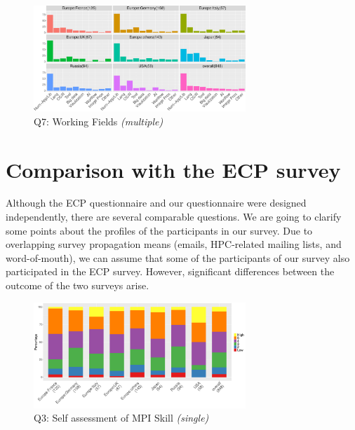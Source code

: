 \documentclass[preprint,5p,times]{elsarticle}
\begin{document}
\begin{figure}[tb]
  \begin{center}
    \includegraphics[width=8.0cm]{R-scripts/Q7.pdf}
    \vspace{-1.5mm}
    \caption{Q7: Working Fields {\it(multiple)}}
    \label{fig:working-fields}
\vspace{-3mm}%
  \end{center}
\end{figure}

\section{Comparison with the ECP survey}\label{sec:ecp}

Although the ECP questionnaire and our questionnaire were designed
independently, there are several comparable
questions. We are
  going to clarify some points about the profiles of the participants
in our survey.
%
Due to overlapping survey propagation means (emails, HPC-related mailing lists, and word-of-mouth), we can assume
that some of the participants of our survey also participated in the ECP survey.
However, significant differences between the outcome of the two surveys arise.

\begin{figure}[tb]
  \begin{center}
    \includegraphics[width=8.0cm]{R-scripts/Q3.pdf}
    \vspace{-1.5mm}
    \caption{Q3: Self assessment of MPI Skill {\it(single)}}
    \label{fig:mpi-skill}
\vspace{-3mm}%
  \end{center}
\end{figure}
\end{document}
